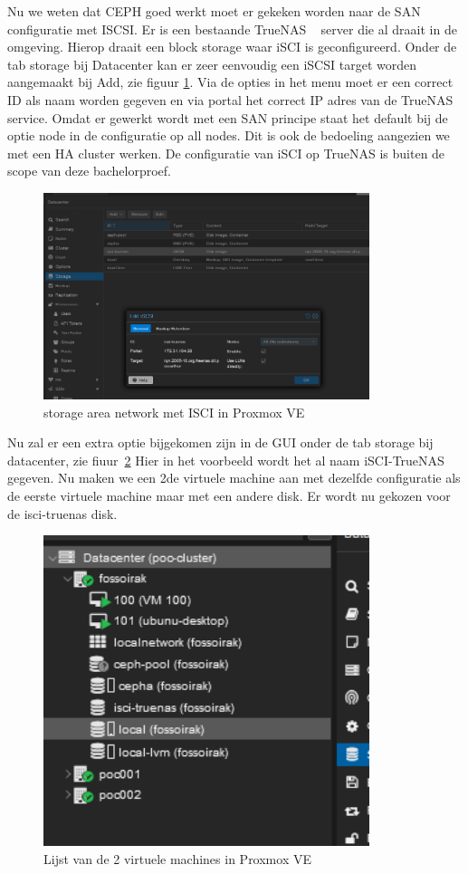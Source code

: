 Nu we weten dat CEPH goed werkt moet er gekeken worden naar de SAN configuratie met ISCSI.
Er is een bestaande TrueNAS ~\autocite{truenas} server die al draait in de omgeving. Hierop draait een block storage waar iSCI is geconfigureerd.
Onder de tab storage bij Datacenter kan er zeer eenvoudig een iSCSI target worden aangemaakt bij Add, zie figuur \ref{fig:iscsi-SAN}.
Via de opties in het menu moet er een correct ID als naam worden gegeven en via portal het correct IP adres van de TrueNAS service.
Omdat er gewerkt wordt met een SAN principe staat het default bij de optie node in de configuratie op all nodes. Dit is ook de bedoeling aangezien we met een HA cluster werken.
De configuratie van iSCI op TrueNAS is buiten de scope van deze bachelorproef.
\begin{figure}[H]
  \centering
  \includegraphics[width=0.85\textwidth]{../poc/iscsi-prox.png}
  \caption{storage area network met ISCI in Proxmox VE}
  \label{fig:iscsi-SAN}
\end{figure}
Nu zal er een extra  optie bijgekomen zijn in de GUI onder de tab storage bij datacenter, zie fiuur~\ref{fig:vm-lijst}  Hier in het voorbeeld wordt het al naam iSCI-TrueNAS gegeven.
Nu maken we een 2de virtuele machine aan met dezelfde configuratie als de eerste virtuele machine maar met een andere disk. Er wordt nu gekozen voor de isci-truenas disk.
\begin{figure}[H]
  \centering
  \includegraphics[width=0.85\textwidth]{../poc/vm-lijst-prox.png}
  \caption{Lijst van de 2 virtuele machines in Proxmox VE}
  \label{fig:vm-lijst}
\end{figure}
